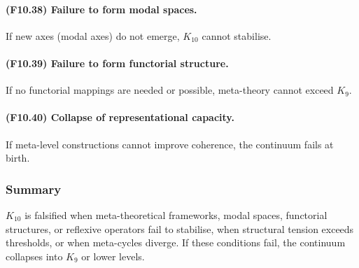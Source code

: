 \paragraph{(F10.38) Failure to form modal spaces.}
If new axes (modal axes) do not emerge,
$K_{10}$ cannot stabilise.

\paragraph{(F10.39) Failure to form functorial structure.}
If no functorial mappings are needed or possible,
meta-theory cannot exceed $K_9$.

\paragraph{(F10.40) Collapse of representational capacity.}
If meta-level constructions cannot improve coherence,
the continuum fails at birth.



\subsubsection{Summary}

$K_{10}$ is falsified when meta-theoretical frameworks,
modal spaces, functorial structures, or reflexive operators
fail to stabilise, when structural tension exceeds thresholds,
or when meta-cycles diverge. If these conditions fail,
the continuum collapses into $K_9$ or lower levels.
